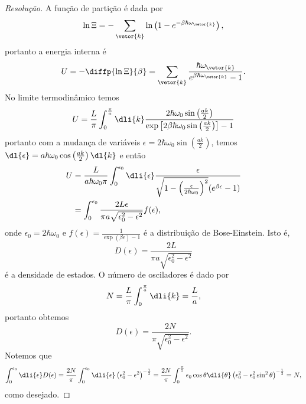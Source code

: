 \begin{proof}[Resolução]
    A função de partição é dada por
    \begin{equation*}
        \ln \Xi = - \sum_{\vetor{k}} \ln\left(1 - e^{-\beta \hbar \omega_{\vetor{k}}}\right),
    \end{equation*}
    portanto a energia interna é
    \begin{equation*}
        U = -\diffp{\ln{\Xi}}{\beta} = \sum_{\vetor{k}} \frac{\hbar \omega_{\vetor{k}}}{e^{\beta \hbar \omega_{\vetor{k}}} - 1}.
    \end{equation*}
    No limite termodinâmico temos
    \begin{equation*}
        U = \frac{L}{\pi} \int_{0}^{\frac{\pi}{a}}\dli{k} \frac{2\hbar \omega_0 \sin\left(\frac{a k}{2}\right)}{\exp\left[2 \beta \hbar \omega_0 \sin\left(\frac{a k}{2}\right)\right] - 1}
    \end{equation*}
    portanto com a mudança de variáveis \(\epsilon = 2 \hbar \omega_0 \sin\left(\frac{ak}{2}\right)\), temos \(\dl{\epsilon} = a \hbar \omega_0 \cos\left(\frac{a k}{2}\right) \dl{k}\) e então
    \begin{align*}
        U &= \frac{L}{a \hbar \omega_0 \pi} \int_0^{\epsilon_0} \dli{\epsilon} \frac{\epsilon}{\sqrt{1 - \left(\frac{\epsilon}{2 \hbar \omega_0}\right)^2}(e^{\beta \epsilon} - 1)}\\
          &= \int_0^{\epsilon_0} \frac{2L \epsilon}{\pi a \sqrt{\epsilon_0^2 - \epsilon^2}} f(\epsilon),
    \end{align*}
    onde \(\epsilon_0 = 2 \hbar \omega_0\) e \(f(\epsilon) = \frac{1}{\exp(\beta \epsilon) - 1}\) é a distribuição de Bose-Einstein. Isto é,
    \begin{equation*}
        D(\epsilon) = \frac{2L}{\pi a \sqrt{\epsilon_0^2-\epsilon^2}}
    \end{equation*}
    é a densidade de estados. O número de osciladores é dado por
    \begin{equation*}
        N = \frac{L}{\pi} \int_0^{\frac{\pi}{a}} \dli{k} = \frac{L}{a},
    \end{equation*}
    portanto obtemos
    \begin{equation*}
        D(\epsilon) = \frac{2N}{\pi \sqrt{\epsilon_0^2 - \epsilon^2}}.
    \end{equation*}
    Notemos que
    \begin{equation*}
        \int_0^{\epsilon_0} \dli{\epsilon} D(\epsilon) = \frac{2N}{\pi}\int_0^{\epsilon_0} \dli{\epsilon} \left(\epsilon_0^2 - \epsilon^2\right)^{-\frac12} = \frac{2N}{\pi} \int_0^{\frac{\pi}{2}} \epsilon_0 \cos\theta\dli{\theta} \left(\epsilon_0^2 - \epsilon_0^2 \sin^2 \theta\right)^{-\frac12} = N,
    \end{equation*}
    como desejado.
\end{proof}

